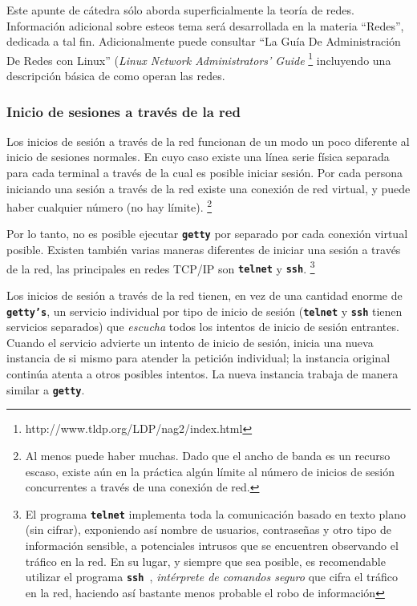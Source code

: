 \documentclass[12pt]{article}
\begin{document}
 Este apunte de cátedra sólo aborda superficialmente la teoría de
redes. Información adicional sobre esteos tema será desarrollada en la materia 
``Redes'', dedicada a tal fin. Adicionalmente puede consultar ``La Guía De Administración 
De Redes con Linux'' (\textit{Linux Network Administrators' Guide} 
\footnote{	http://www.tldp.org/LDP/nag2/index.html}
incluyendo una descripción básica de como
operan las redes.  

\subsubsection{ Inicio de sesiones a través de la red}

 Los inicios de sesión a través de la red funcionan de un modo un poco
diferente al inicio de sesiones normales. En cuyo caso existe una línea serie 
física separada para cada terminal a través de la cual es posible iniciar sesión. 
Por cada persona iniciando una sesión a través de la red existe una conexión de red
virtual, y puede haber cualquier número (no hay límite).  
\footnote{Al menos puede haber muchas. Dado que el ancho de banda es un
recurso escaso, existe aún en la práctica algún límite al
número de inicios de sesión concurrentes a través de una conexión
de red. }

Por lo tanto, no es posible ejecutar \texttt{\textbf{getty}} por separado 
por cada conexión virtual posible. Existen
también varias maneras diferentes de iniciar una sesión a través de la red, las
principales en redes TCP/IP son \texttt{\textbf{telnet}} y \texttt{\textbf{ssh}}.
\footnote{El programa \texttt{\textbf{telnet}} implementa toda la comunicación basado en
texto plano (sin cifrar), exponiendo así nombre de usuarios, contraseñas y otro tipo de 
información sensible, a potenciales intrusos que se encuentren observando el tráfico en la red. 
En su lugar, y siempre que sea posible, es recomendable utilizar el programa \texttt{\textbf{ssh }}, 
\textit{intérprete de comandos seguro} que cifra el tráfico en la red, haciendo
así bastante menos probable el robo de información}


 Los inicios de sesión a través de la red tienen, en vez de una cantidad
enorme de \texttt{\textbf{getty's}}, un servicio individual por tipo de 
inicio de sesión (\texttt{\textbf{telnet}} y \texttt{\textbf{ssh}}
tienen servicios separados) que \textit{escucha} todos los intentos de inicio de
sesión entrantes. Cuando el servicio advierte un intento de inicio de sesión,
inicia una nueva instancia de si mismo para atender la petición individual; la
instancia original continúa atenta a otros posibles intentos. La nueva instancia
trabaja de manera similar a \texttt{\textbf{getty}}.  
\end{document}

